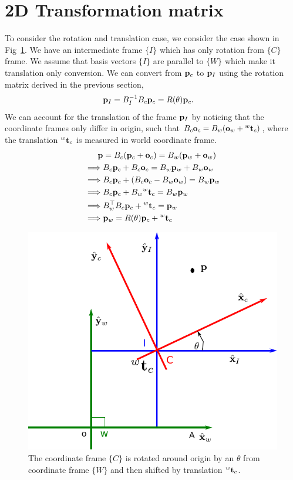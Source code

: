 \documentclass[twocolumn]{article}
\begin{document}
\section{2D Transformation matrix}

To consider the rotation and  translation case, we consider  the case shown in Fig~\ref{fig:rot+trans-2D}.
We have  an  intermediate frame $\{I\}$ which has only  rotation from $\{C\}$
frame. We assume that basis   vectors  $\{I\}$ are parallel to $\{W\}$ which
make it translation only conversion. We can convert  from $\mathbf{p}_c$ to $\mathbf{p}_I$
using  the rotation   matrix  derived  in the previous section,
%
\begin{align}
  \mathbf{p}_I  &=  B_I^{-1} B_c \mathbf{p}_c = R(\theta) \mathbf{p}_c.
\end{align}
%
We can account  for the  translation of the frame $\mathbf{p}_I$ by noticing that the
coordinate frames only  differ  in  origin, such that $B_c\mathbf{o}_c =  B_w(\mathbf{o}_w +
{}^w\mathbf{t}_c)$, where   the  translation ${}^w\mathbf{t}_c$ is  measured in  world
coordinate  frame.
\begin{align}
  \mathbf{p}  &=   B_c (\mathbf{p}_c + \mathbf{o}_c) =   B_w (\mathbf{p}_w  +  \mathbf{o}_w)
  \notag\\
  \implies   &B_c \mathbf{p}_c + B_c \mathbf{o}_c =   B_w \mathbf{p}_w  +  B_w \mathbf{o}_w
\notag\\
  \implies   &B_c \mathbf{p}_c + (B_c \mathbf{o}_c -  B_w \mathbf{o}_w)  =   B_w \mathbf{p}_w  
\notag\\
  \implies   &B_c \mathbf{p}_c + B_w {}^w\mathbf{t}_c  =   B_w \mathbf{p}_w  
\notag\\
  \implies   &B_w^{\top}  B_c \mathbf{p}_c + {}^w\mathbf{t}_c  =   \mathbf{p}_w  
\notag\\
  \implies   &\mathbf{p}_w = R(\theta) \mathbf{p}_c + {}^w\mathbf{t}_c
\end{align}

\begin{figure}
  \includegraphics[width=\linewidth]{media/rot+trans-2D.pdf}
  \caption{The coordinate  frame $\{C\}$  is rotated around origin by an $\theta$
    from coordinate  frame $\{W\}$ and then shifted by translation ${}^w\mathbf{t}_c$.}
  \label{fig:rot+trans-2D}
\end{figure}
\end{document}
